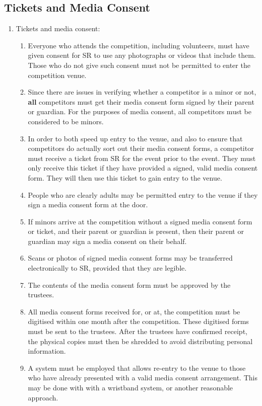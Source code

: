 \subsection{Tickets and Media Consent}
  \begin{enumerate}
  
\item Tickets and media consent:
  \begin{enumerate}
  \item Everyone who attends the competition, including volunteers, must have given consent for SR to use any photographs or videos that include them.  Those who do not give such consent must not be permitted to enter the competition venue.

  \item Since there are issues in verifying whether a competitor is a minor or not, \textbf{all} competitors must get their media consent form signed by their parent or guardian.  For the purposes of media consent, all competitors must be considered to be minors.

  \item In order to both speed up entry to the venue, and also to ensure that competitors do actually sort out their media consent forms, a competitor must receive a ticket from SR for the event prior to the event.  They must only receive this ticket if they have provided a signed, valid media consent form.  They will then use this ticket to gain entry to the venue.

  \item People who are clearly adults may be permitted entry to the venue if they sign a media consent form at the door.

  \item If minors arrive at the competition without a signed media consent form or ticket, and their parent or guardian is present, then their parent or guardian may sign a media consent on their behalf.

  \item Scans or photos of signed media consent forms may be transferred electronically to SR, provided that they are legible.

  \item The contents of the media consent form must be approved by the trustees.

  \item All media consent forms received for, or at, the competition must be digitised within one month after the competition.  These digitised forms must be sent to the trustees.  After the trustees have confirmed receipt, the physical copies must then be shredded to avoid distributing personal information.

  \item A system must be employed that allows re-entry to the venue to those who have already presented with a valid media consent arrangement.  This may be done with with a wristband system, or another reasonable approach.
  \end{enumerate}

  \end{enumerate}

